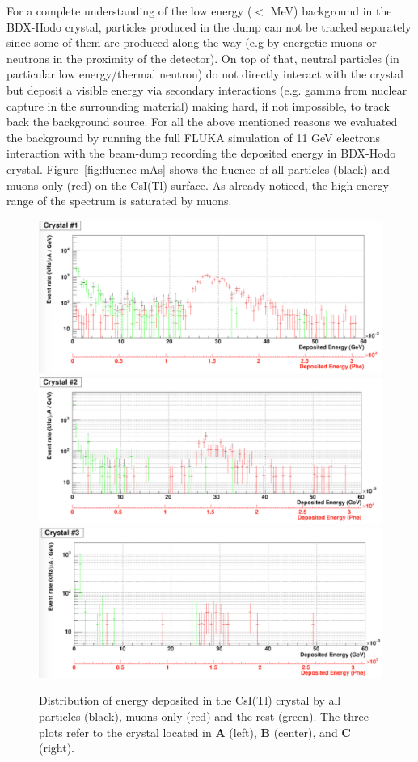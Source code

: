 For a complete understanding of the low energy ($<$ MeV) background in the BDX-Hodo crystal, particles produced in the dump can not be tracked separately since some of them are produced along the way (e.g by energetic muons or neutrons in the proximity of the detector). On top of that, neutral particles (in particular low energy/thermal neutron) do not directly interact with the crystal but deposit a visible energy via secondary interactions (e.g. gamma from nuclear capture in the surrounding material) making hard, if not impossible,  to track back the background source. For all the above mentioned reasons we evaluated the background by running the  full FLUKA simulation of  11 GeV electrons interaction with the beam-dump recording  the deposited energy in BDX-Hodo crystal. 
Figure~\ref{fig:fluence-mAs} shows the fluence of all particles (black) and muons only (red) on the CsI(Tl) surface. As already noticed, the high energy range of the spectrum is saturated by muons. 
\begin{figure}[h!] 
\center
\includegraphics[width=12.0cm]{figs/Edep1.pdf}
\includegraphics[width=12.0cm]{figs/Edep2.pdf} 
\includegraphics[width=12.0cm]{figs/Edep3.pdf}
\caption {Distribution of energy deposited in the CsI(Tl) crystal by all particles (black), muons only (red) and the rest (green). The three plots refer to the crystal located in {\bf A} (left),  {\bf B} (center), and {\bf C} (right).}
\label{fig:edep}
\end{figure}
